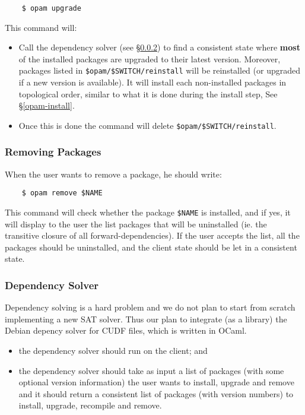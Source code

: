 \documentclass[a4paper,10pt]{article}
\begin{document}
\begin{verbatim}
    $ opam upgrade
\end{verbatim}

This command will:

\begin{itemize}

\item Call the dependency solver (see \S\ref{deps}) to
find a consistent state where {\bf most} of the installed packages are
upgraded to their latest version. Moreover, packages listed in
\verb+$opam/$SWITCH/reinstall+ will be reinstalled (or upgraded if a new
version is available). It will install each non-installed packages in
topological order, similar to what it is done during the install step,
See \S\ref{opam-install}.

\item Once this is done the command will delete
  \verb+$opam/$SWITCH/reinstall+.

\end{itemize}
\subsubsection{Removing Packages}
\label{opam-remove}

When the user wants to remove a package, he should write:

\begin{verbatim}
    $ opam remove $NAME
\end{verbatim}

This command will check whether the package \verb+$NAME+ is installed,
and if yes, it will display to the user the list packages that will be
uninstalled (ie. the transitive closure of all forward-dependencies).
If the user accepts the list, all the packages should be uninstalled,
and the client state should be let in a consistent state.

\subsubsection{Dependency Solver}
\label{deps}

Dependency solving is a hard problem and we do not plan to start from
scratch implementing a new SAT solver. Thus our plan to integrate (as
a library) the Debian depency solver for CUDF files, which is written
in OCaml.

\begin{itemize}
\item the dependency solver should run on the client; and
\item the dependency solver should take as input a list of packages
  (with some optional version information) the user wants to install,
  upgrade and remove and it should return a consistent list of
  packages (with version numbers) to install, upgrade, recompile and
  remove.
\end{itemize}
\end{document}
